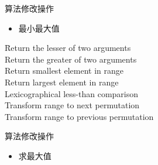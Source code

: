 \begin{frame}[t, fragile]{算法}{修改操作}
  \begin{itemize}
  \item 最小最大值
  \end{itemize}
  \begin{mytabbing}[\scriptsize]
     \hspace{12em} \= Return the lesser of two arguments\\
     \> Return the greater of two arguments\\
     \> Return smallest element in range\\
     \> Return largest element in range\\
     \> Lexicographical less-than comparison\\
     \> Transform range to next permutation\\
     \> Transform range to previous permutation 
  \end{mytabbing}
\end{frame}

\begin{frame}[t, fragile]{算法}{修改操作}
  \begin{itemize}
  \item 求最大值
  \end{itemize}
  \begin{center}
  \end{center}
\end{frame}


